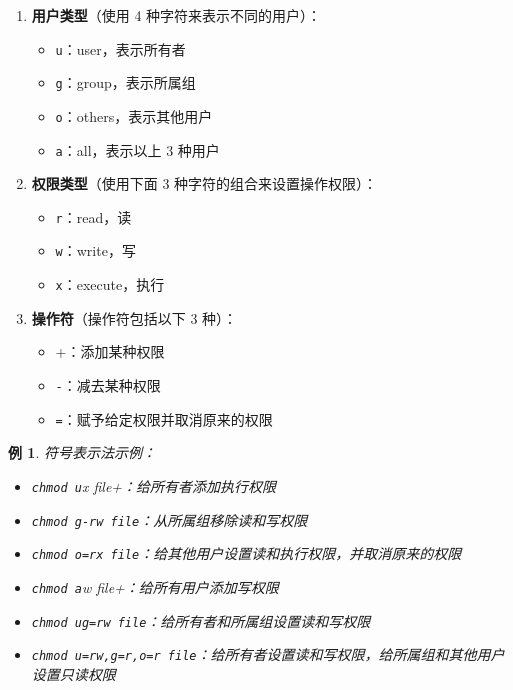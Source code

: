 \documentclass[12pt,UTF8]{ctexbook}
\newtheorem{example}{例}[chapter]
\begin{document}
\begin{enumerate}
    \item \textbf{用户类型}（使用 4 种字符来表示不同的用户）：
    \begin{itemize}
        \item \verb+u+：user，表示所有者
        \item \verb+g+：group，表示所属组
        \item \verb+o+：others，表示其他用户
        \item \verb+a+：all，表示以上 3 种用户
    \end{itemize}
    
    \item \textbf{权限类型}（使用下面 3 种字符的组合来设置操作权限）：
    \begin{itemize}
        \item \verb+r+：read，读
        \item \verb+w+：write，写
        \item \verb+x+：execute，执行
    \end{itemize}
    
    \item \textbf{操作符}（操作符包括以下 3 种）：
    \begin{itemize}
        \item \verb+++：添加某种权限
        \item \verb+-+：减去某种权限
        \item \verb+=+：赋予给定权限并取消原来的权限
    \end{itemize}
\end{enumerate}

\begin{example}
符号表示法示例：
\begin{itemize}
    \item \verb+chmod u+x file+：给所有者添加执行权限
    \item \verb+chmod g-rw file+：从所属组移除读和写权限
    \item \verb+chmod o=rx file+：给其他用户设置读和执行权限，并取消原来的权限
    \item \verb+chmod a+w file+：给所有用户添加写权限
    \item \verb+chmod ug=rw file+：给所有者和所属组设置读和写权限
    \item \verb+chmod u=rw,g=r,o=r file+：给所有者设置读和写权限，给所属组和其他用户设置只读权限
\end{itemize}
\end{example}
\end{document}
